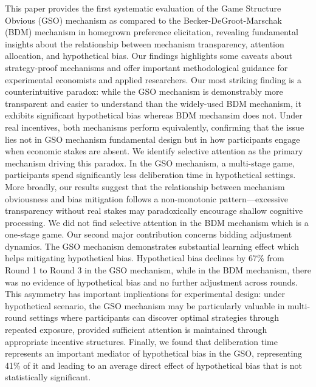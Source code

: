 \documentclass[12pt]{article}
\begin{document}
This paper provides the first systematic evaluation of the Game Structure Obvious (GSO) mechanism as compared to the Becker-DeGroot-Marschak (BDM) mechanism in homegrown preference elicitation, revealing fundamental insights about the relationship between mechanism transparency, attention allocation, and hypothetical bias. Our findings highlights some caveats about strategy-proof mechanisms and offer important methodological guidance for experimental economists and applied researchers.
Our most striking finding is a counterintuitive paradox: while the GSO mechanism is demonstrably more transparent and easier to understand than the widely-used BDM mechanism, it exhibits significant hypothetical bias whereas BDM mechansim does not. Under real incentives, both mechanisms perform equivalently, confirming that the issue lies not in GSO mechanism fundamental design but in how participants engage when economic stakes are absent.
We identify selective attention as the primary mechanism driving this paradox. In the GSO mechanism, a multi-stage game, participants spend significantly less deliberation time in hypothetical settings. More broadly, our results suggest that the relationship between mechanism obviousness and bias mitigation follows a non-monotonic pattern—excessive transparency without real stakes may paradoxically encourage shallow cognitive processing. We did not find selective attention in the BDM mechanism which is a one-stage game.
Our second major contribution concerns bidding adjustment dynamics. The GSO mechanism demonstrates substantial learning effect which helps mitigating hypothetical bias. Hypothetical bias declines by 67\% from Round 1 to Round 3 in the GSO mechanism, while in the BDM mechanism, there was no evidence of hypothetical bias and no further adjustment across rounds. This asymmetry has important implications for experimental design: under hypothetical scenario, the GSO mechanism may be particularly valuable in multi-round settings where participants can discover optimal strategies through repeated exposure, provided sufficient attention is maintained through appropriate incentive structures. Finally, we found that deliberation time represents an important mediator of hypothetical bias in the GSO, representing 41\% of it and leading to an average direct effect of hypothetical bias that is not statistically significant.
\end{document}
